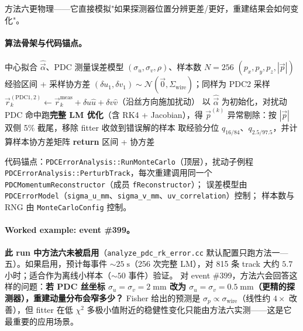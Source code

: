 \documentclass[a4paper, 11pt]{article}
\begin{document}
方法六更物理——它直接模拟"如果探测器位置分辨更差/更好，重建结果会如何变化"。

\paragraph{算法骨架与代码锚点。}

\begin{algorithm}[H]
\caption{方法六：PDC 端到端测量误差传播}
\label{alg:mc_pdc}
\begin{algorithmic}[1]
\Require 中心拟合 $\hat{\vec{\alpha}}$、PDC 测量误差模型 $(\sigma_u, \sigma_v, \rho)$、样本数 $N = 256$
\Ensure $(p_x, p_y, p_z, |\vec{p}|)$ 经验区间 + 采样协方差
  \State $(\delta u_1, \delta v_1) \sim \mathcal{N}(\vec{0}, \Sigma_\mathrm{wire})$；同样为 PDC2 采样
  \State $\vec{r}_k^{(\mathrm{PDC1,2})} \gets \vec{r}_k^\mathrm{meas} + \delta u \hat{u} + \delta v \hat{v}$（沿丝方向施加扰动）
  \State 以 $\hat{\vec{\alpha}}$ 为初始化，对扰动 PDC 命中跑\textbf{完整 LM 优化}（含 RK4 + Jacobian），得 $\vec{p}^{(k)}$
\EndFor
\State 异常剔除：按 $|\vec{p}|$ 双侧 5\% 截尾，移除 fitter 收敛到错误解的样本
\State 取经验分位 $q_{16/84}$、$q_{2.5/97.5}$，并计算样本协方差矩阵
\State \textbf{return} 区间 + 协方差
\end{algorithmic}
\end{algorithm}

代码锚点：\texttt{PDCErrorAnalysis::RunMonteCarlo}（顶层），扰动子例程 \texttt{PDCErrorAnalysis::PerturbTrack}，每次重建调用同一个 \texttt{PDCMomentumReconstructor}（成员 \texttt{fReconstructor}）；
误差模型由 \texttt{PDCErrorModel}（\texttt{sigma\_u\_mm}、\texttt{sigma\_v\_mm}、\texttt{uv\_correlation}）控制；
样本数与 RNG 由 \texttt{MonteCarloConfig} 控制。

\paragraph{Worked example: event \#399。}
\textbf{此 run 中方法六未被启用}（\texttt{analyze\_pdc\_rk\_error.cc} 默认配置只跑方法一—五）。如果启用，预计每事件 $\sim 25\;\mathrm{s}$（256 次完整 LM），对 815 条 track 大约 $5.7$ 小时；适合作为离线小样本（$\sim 50$ 事件）验证。
对 event \#399，方法六会回答这样的问题：\textbf{若 PDC 丝坐标 $\sigma_u = \sigma_v = 2\;\mathrm{mm}$ 改为 $\sigma_u = \sigma_v = 0.5\;\mathrm{mm}$（更精的探测器），重建动量分布会窄多少？} Fisher 给出的预测是 $\sigma_p \propto \sigma_\mathrm{wire}$（线性约 $4\times$ 改善），但 fitter 在低 $\chi^2$ 多极小值附近的稳健性变化只能由方法六实测——这是它最重要的应用场景。
\end{document}
